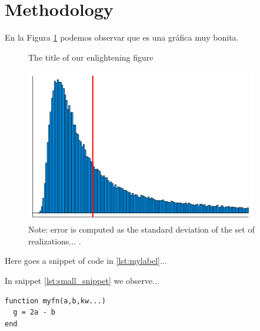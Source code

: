 \section{Methodology}
\label{section:methodology}


En la Figura \ref{figure:awesome_figure} podemos observar que es una gráfica muy bonita.

\lipsum[1]

\begin{figure}[htb]
  \caption{The title of our enlightening figure}
  \label{figure:awesome_figure}
  \centering 
  \includegraphics[width=0.9\textwidth]{figures/mse_distribution.png}
  \caption*{\footnotesize Note: error is computed as the standard deviation of the set of realizations... .}
\end{figure}

\lipsum[1]

Here goes a snippet of code in \ref{lst:mylabel}... 



In snippet \ref{lst:small_snippet} we observe... 

\begin{lstlisting}[caption={A small snippet}, label={lst:small_snippet}]
function myfn(a,b,kw...)
  g = 2a - b
end
\end{lstlisting}